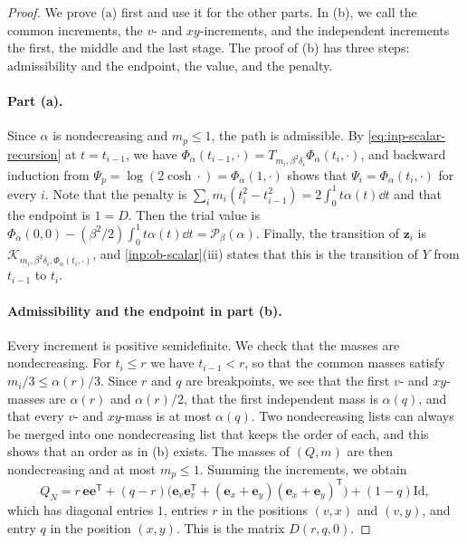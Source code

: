 \begin{proof}
We prove (a) first and use it for the other parts. In (b), we call the common
increments, the $v$- and $xy$-increments, and the independent increments the
first, the middle and the last stage. The proof of (b) has three steps:
admissibility and the endpoint, the value, and the penalty.

\paragraph{Part (a).} Since $\alpha$ is nondecreasing and $m_p\le1$, the path is
admissible. By \eqref{eq:inp-scalar-recursion} at $t=t_{i-1}$, we have
$\Phi_\alpha(t_{i-1},\cdot)=T_{m_i,\beta^2\delta_i}\Phi_\alpha(t_i,\cdot)$, and
backward induction from $\Psi_p=\log(2\cosh\cdot)=\Phi_\alpha(1,\cdot)$ shows that
$\Psi_i=\Phi_\alpha(t_i,\cdot)$ for every $i$. Note that the penalty is
$\sum_im_i(t_i^2-t_{i-1}^2)=2\int_0^1t\alpha(t)\dd t$ and that the endpoint is
$1=D$. Then the trial value is $\Phi_\alpha(0,0)-(\beta^2/2)\int_0^1t\alpha(t)\dd t
=\mathcal P_\beta(\alpha)$. Finally, the transition of $\mathbf z_i$ is
$\mathcal K_{m_i,\beta^2\delta_i,\Phi_\alpha(t_i,\cdot)}$, and
\cref{inp:ob-scalar}(iii) states that this is the transition of $Y$ from
$t_{i-1}$ to $t_i$.

\paragraph{Admissibility and the endpoint in part (b).} Every increment is positive
semidefinite. We check that the masses are nondecreasing. For $t_i\le r$ we
have $t_{i-1}<r$, so that the common masses satisfy $m_i/3\le\alpha(r)/3$. Since
$r$ and $q$ are breakpoints, we see that the first $v$- and $xy$-masses are
$\alpha(r)$ and $\alpha(r)/2$, that the first independent mass is $\alpha(q)$,
and that every $v$- and $xy$-mass is at most $\alpha(q)$. Two nondecreasing
lists can always be merged into one nondecreasing list that keeps the order of
each, and this shows that an order as in (b) exists. The masses of $(Q,m)$ are
then nondecreasing and at most $m_p\le1$. Summing the increments, we obtain
\[
 Q_N=r\,\mathbf e\mathbf e^{\mathsf T}+(q-r)\bigl(\mathbf e_v\mathbf e_v^{\mathsf T}
 +(\mathbf e_x+\mathbf e_y)(\mathbf e_x+\mathbf e_y)^{\mathsf T}\bigr)+(1-q)\mathrm{Id},
\]
which has diagonal entries $1$, entries $r$ in the positions $(v,x)$ and $(v,y)$,
and entry $q$ in the position $(x,y)$. This is the matrix $D(r,q,0)$.


\end{proof}
